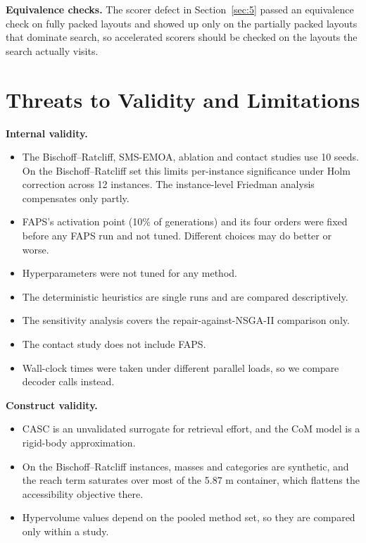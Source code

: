 \documentclass[journal]{IEEEtran}
\providecommand{\tightlist}{\setlength{\itemsep}{0pt}\setlength{\parskip}{0pt}}
\begin{document}
\textbf{Equivalence checks.} The scorer defect in Section~\ref{sec:5} passed an equivalence check on fully packed layouts and showed up only on the partially packed layouts that dominate search, so accelerated scorers should be checked on the layouts the search actually visits.

\section{Threats to Validity and Limitations}\label{sec:8}

\textbf{Internal validity.}

\begin{itemize}
\tightlist
\item
  The Bischoff--Ratcliff, SMS-EMOA, ablation and contact studies use 10 seeds. On the Bischoff--Ratcliff set this limits per-instance significance under Holm correction across 12 instances. The instance-level Friedman analysis compensates only partly.
\item
  FAPS's activation point (10\% of generations) and its four orders were fixed before any FAPS run and not tuned. Different choices may do better or worse.
\item
  Hyperparameters were not tuned for any method.
\item
  The deterministic heuristics are single runs and are compared descriptively.
\item
  The sensitivity analysis covers the repair-against-NSGA-II comparison only.
\item
  The contact study does not include FAPS.
\item
  Wall-clock times were taken under different parallel loads, so we compare decoder calls instead.
\end{itemize}

\textbf{Construct validity.}

\begin{itemize}
\tightlist
\item
  CASC is an unvalidated surrogate for retrieval effort, and the CoM model is a rigid-body approximation.
\item
  On the Bischoff--Ratcliff instances, masses and categories are synthetic, and the reach term saturates over most of the 5.87 m container, which flattens the accessibility objective there.
\item
  Hypervolume values depend on the pooled method set, so they are compared only within a study.
\end{itemize}
\end{document}
